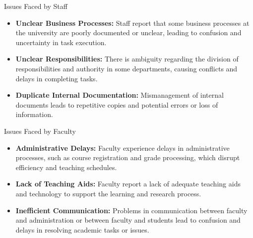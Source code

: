 \documentclass[aspectratio=169, table]{beamer}
\begin{document}
\begin{frame}{Issues Faced by Staff}
	\begin{itemize}
		\item \textbf{Unclear Business Processes:} Staff report that some business processes at the university are poorly documented or unclear, leading to confusion and uncertainty in task execution.
		\item \textbf{Unclear Responsibilities:} There is ambiguity regarding the division of responsibilities and authority in some departments, causing conflicts and delays in completing tasks.
		\item \textbf{Duplicate Internal Documentation:} Mismanagement of internal documents leads to repetitive copies and potential errors or loss of information.
	\end{itemize}
\end{frame}

\begin{frame}{Issues Faced by Faculty}
	\begin{itemize}
		\item \textbf{Administrative Delays:} Faculty experience delays in administrative processes, such as course registration and grade processing, which disrupt efficiency and teaching schedules.
		\item \textbf{Lack of Teaching Aids:} Faculty report a lack of adequate teaching aids and technology to support the learning and research process.
		\item \textbf{Inefficient Communication:} Problems in communication between faculty and administration or between faculty and students lead to confusion and delays in resolving academic tasks or issues.
	\end{itemize}
\end{frame}
\end{document}
